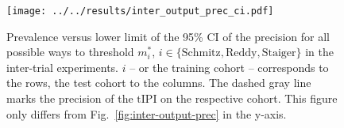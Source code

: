 \begin{figure}
    \centering
    \texttt{[image: ../../results/inter\_output\_prec\_ci.pdf]}
    \caption{Prevalence versus lower limit of the \num{95}\% CI of the precision for all possible 
        ways to threshold $m^*_i$, $i \in \{ \text{Schmitz}, \text{Reddy}, \text{Staiger} \}$ in 
        the inter-trial experiments. $i$ -- or the training cohort -- corresponds to the rows, the 
        test cohort to the columns. The dashed gray 
        line marks the precision of the $\text{tIPI}$ on the respective cohort. This figure only 
        differs from Fig.\ \ref{fig:inter-output-prec} in the y-axis.}
    \label{fig:inter-output-prec-ci}
\end{figure}